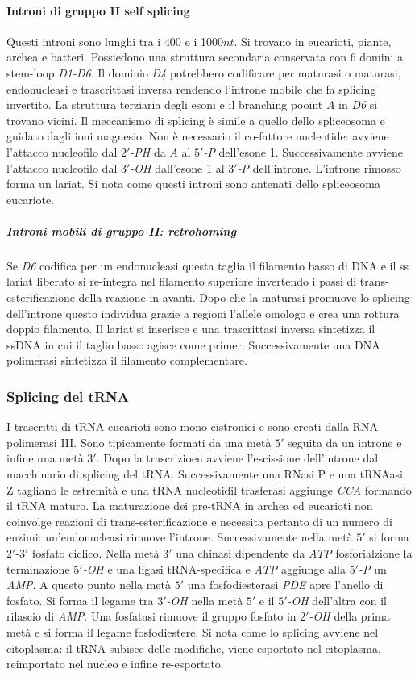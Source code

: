 \paragraph{Introni di gruppo II self splicing}
Questi introni sono lunghi tra i $400$ e i \num{1000}$nt$. Si trovano in eucarioti, piante, archea e batteri. Possiedono una struttura secondaria conservata con $6$ domini a stem-loop
\emph{D1-D6}. Il dominio \emph{D4} potrebbero codificare per maturasi o maturasi, endonucleasi e trascrittasi inversa rendendo l'introne mobile che fa splicing invertito. La struttura
terziaria degli esoni e il branching pooint $A$ in \emph{D6} si trovano vicini. Il meccanismo di splicing \`e simile a quello dello spliceosoma e guidato dagli ioni magnesio. Non 
\`e necessario il co-fattore nucleotide: avviene l'attacco nucleofilo dal \emph{$2'$-PH} da $A$ al \emph{$5'$-P} dell'esone 1. Successivamente avviene l'attacco nucleofilo dal 
\emph{$3'$-OH} dall'esone 1 al \emph{$3'$-P} dell'introne. L'introne rimosso forma un lariat. Si nota come questi introni sono antenati dello spliceosoma eucariote. 
\subparagraph{Introni mobili di gruppo II: retrohoming}
Se \emph{D6} codifica per un endonucleasi questa taglia il filamento basso di DNA e il ss lariat liberato si re-integra nel filamento superiore invertendo i passi di 
trans-esterificazione della reazione in avanti. Dopo che la maturasi promuove lo splicing dell'introne questo individua grazie a regioni l'allele omologo e crea una rottura doppio
filamento. Il lariat si inserisce e una trascrittasi inversa sintetizza il ssDNA in cui il taglio basso agisce come primer. Successivamente una DNA polimerasi sintetizza il filamento
complementare. 	
\subsubsection{Splicing del tRNA}
I trascritti di tRNA eucarioti sono mono-cistronici e sono creati dalla RNA polimerasi III. Sono tipicamente formati da una met\`a $5'$ seguita da un introne e infine una met\`a $3'$. 
Dopo la trascrizioen avviene l'escissione dell'introne dal macchinario di splicing del tRNA. Successivamente una RNasi P e una tRNAasi Z tagliano le estremit\`a e una tRNA nucleotidil
trasferasi aggiunge \emph{CCA} formando il tRNA maturo. La maturazione dei pre-tRNA in archea ed eucarioti non coinvolge reazioni di trans-esterificazione e necessita pertanto di 
un numero di enzimi: un'endonucleasi rimuove l'introne. Successivamente nella met\`a $5'$ si forma $2'$-$3'$ fosfato ciclico. Nella met\`a $3'$ una chinasi dipendente da \emph{ATP} 
fosforialzione la terminazione \emph{$5'$-OH} e una ligasi tRNA-specifica e \emph{ATP} aggiunge alla \emph{$5'$-P} un \emph{AMP}. A questo punto nella met\`a $5'$ una fosfodiesterasi
\emph{PDE} apre l'anello di fosfato. Si forma il legame tra \emph{$3'$-OH} nella met\`a $5'$ e il \emph{$5'$-OH} dell'altra con il rilascio di \emph{AMP}. Una fosfatasi rimuove il gruppo
fosfato in \emph{$2'$-OH} della prima met\`a e si forma il legame fosfodiestere. Si nota come lo splicing avviene nel citoplasma: il tRNA subisce delle modifiche, viene esportato nel
citoplasma, reimportato nel nucleo e infine re-esportato. 
